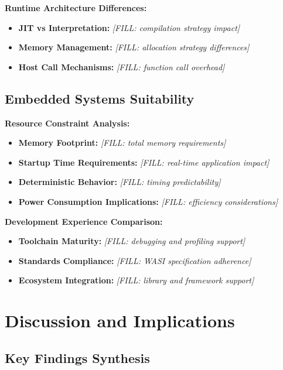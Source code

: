 \textbf{Runtime Architecture Differences:}
\begin{itemize}
    \item \textbf{JIT vs Interpretation:} \textit{[FILL: compilation strategy impact]}
    \item \textbf{Memory Management:} \textit{[FILL: allocation strategy differences]}
    \item \textbf{Host Call Mechanisms:} \textit{[FILL: function call overhead]}
\end{itemize}

\subsection{Embedded Systems Suitability}
\label{subsec:embedded-suitability}

\textbf{Resource Constraint Analysis:}
\begin{itemize}
    \item \textbf{Memory Footprint:} \textit{[FILL: total memory requirements]}
    \item \textbf{Startup Time Requirements:} \textit{[FILL: real-time application impact]}
    \item \textbf{Deterministic Behavior:} \textit{[FILL: timing predictability]}
    \item \textbf{Power Consumption Implications:} \textit{[FILL: efficiency considerations]}
\end{itemize}

\textbf{Development Experience Comparison:}
\begin{itemize}
    \item \textbf{Toolchain Maturity:} \textit{[FILL: debugging and profiling support]}
    \item \textbf{Standards Compliance:} \textit{[FILL: WASI specification adherence]}
    \item \textbf{Ecosystem Integration:} \textit{[FILL: library and framework support]}
\end{itemize}

\section{Discussion and Implications}
\label{sec:discussion-implications}

\subsection{Key Findings Synthesis}
\label{subsec:key-findings}

